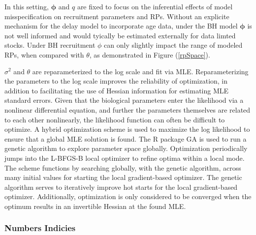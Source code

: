 %
In this setting, $\bm{\phi}$ and $q$ are fixed %
to focus on the inferential effects of model misspecification on recruitment
parameters and RPs. Without an explicite mechanism for the delay model to incorporate
age data, under the BH model $\bm{\phi}$ is not well informed and would
tyically be estimated externally for data limted stocks. Under BH recruitment
$\phi$ can only slightly impact the range of modeled RPs, when compared with $\theta$, 
as demonstrated in Figure (\ref{rpSpace}).

%
$\sigma^2$ and $\theta$ are reparameterized to the log scale and fit via MLE.
Reparameterizing the parameters to the log scale improves the reliability of
optimization, in addition to facilitating the use of Hessian information for
estimating MLE standard errors. Given that the biological parameters enter the
likelihood via a nonlinear differential equation, and further the parameters
themselves are related to each other nonlinearly, the likelihood function can
often be difficult to optimize. A hybrid optimization scheme is used to
maximize the log likelihood to ensure that a global MLE solution is found. The
R package GA \cite{scrucca_ga_2013, scrucca_extensions_2017} is used to
run a genetic algorithm to explore parameter space globally. Optimization
periodically jumps into the L-BFGS-B local optimizer to refine optima within a
local mode. The scheme functions by searching globally, with the genetic
algorithm, across many initial values for starting the local gradient-based
optimizer. The genetic algorithm serves to iteratively improve hot starts for
the local gradient-based optimizer. Additionally, optimization is only
considered to be converged when the optimum results in an invertible Hessian at
the found MLE.

%
\subsubsection{Numbers Indicies}


